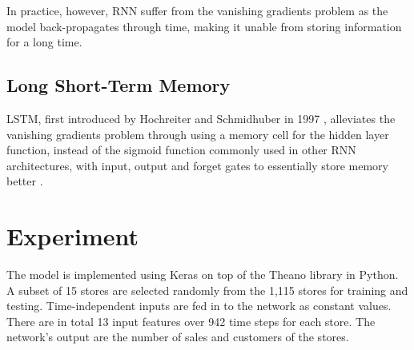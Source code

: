 \documentclass[DIV=calc, paper=a4, fontsize=11pt, twocolumn]{scrartcl}
\begin{document}
In practice, however, RNN suffer from the vanishing gradients problem as the model back-propagates through time, making it unable from storing information for a long time.

\subsection{Long Short-Term Memory}
LSTM, first introduced by Hochreiter and Schmidhuber in 1997 \cite{Hochreiter:1997:LSM:1246443.1246450}, alleviates the vanishing gradients problem through using a memory cell for the hidden layer function, instead of the sigmoid function commonly used in other RNN architectures, with input, output and forget gates to essentially store memory better \cite{DBLP:journals/corr/Graves13}.

\section{Experiment}
The model is implemented using Keras on top of the Theano library in Python. A subset of 15 stores are selected randomly from the 1,115 stores for training and testing. Time-independent inputs are fed in to the network as constant values. There are in total 13 input features over 942 time steps for each store. The network's output are the number of sales and customers of the stores.
\end{document}
